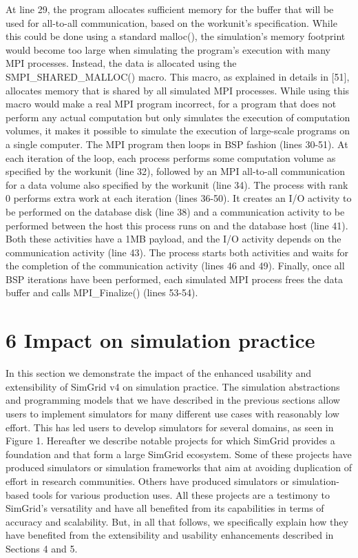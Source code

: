 \documentclass[
]{article}
\begin{document}
At line 29, the program allocates sufficient memory for the buffer that
will be used for all-to-all communication, based on the workunit's
specification. While this could be done using a standard malloc(), the
simulation's memory footprint would become too large when simulating the
program's execution with many MPI processes. Instead, the data is
allocated using the SMPI\_SHARED\_MALLOC() macro. This macro, as
explained in details in {[}51{]}, allocates memory that is shared by all
simulated MPI processes. While using this macro would make a real MPI
program incorrect, for a program that does not perform any actual
computation but only simulates the execution of computation volumes, it
makes it possible to simulate the execution of large-scale programs on a
single computer. The MPI program then loops in BSP fashion (lines
30-51). At each iteration of the loop, each process performs some
computation volume as specified by the workunit (line 32), followed by
an MPI all-to-all communication for a data volume also specified by the
workunit (line 34). The process with rank 0 performs extra work at each
iteration (lines 36-50). It creates an I/O activity to be performed on
the database disk (line 38) and a communication activity to be performed
between the host this process runs on and the database host (line 41).
Both these activities have a 1MB payload, and the I/O activity depends
on the communication activity (line 43). The process starts both
activities and waits for the completion of the communication activity
(lines 46 and 49). Finally, once all BSP iterations have been performed,
each simulated MPI process frees the data buffer and calls
MPI\_Finalize() (lines 53-54).

\section{6 Impact on simulation
practice}\label{impact-on-simulation-practice}

In this section we demonstrate the impact of the enhanced usability and
extensibility of SimGrid v4 on simulation practice. The simulation
abstractions and programming models that we have described in the
previous sections allow users to implement simulators for many different
use cases with reasonably low effort. This has led users to develop
simulators for several domains, as seen in Figure 1. Hereafter we
describe notable projects for which SimGrid provides a foundation and
that form a large SimGrid ecosystem. Some of these projects have
produced simulators or simulation frameworks that aim at avoiding
duplication of effort in research communities. Others have produced
simulators or simulation-based tools for various production uses. All
these projects are a testimony to SimGrid's versatility and have all
benefited from its capabilities in terms of accuracy and scalability.
But, in all that follows, we specifically explain how they have
benefited from the extensibility and usability enhancements described in
Sections 4 and 5.
\end{document}
